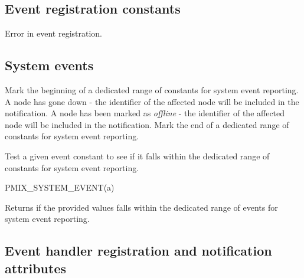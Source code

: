 \subsection{Event registration constants}
\label{api:struct:constants:event}

\begin{constantdesc}
%
Error in event registration.
%
\end{constantdesc}

\subsection{System events}
\label{api:struct:sys:event}

\begin{constantdesc}
%
Mark the beginning of a dedicated range of constants for system event reporting.
%
A node has gone down - the identifier of the affected node will be included in the notification.
%
A node has been marked as \emph{offline} - the identifier of the affected node will be included in the notification.
%
Mark the end of a dedicated range of constants for system event reporting.
%
\end{constantdesc}


Test a given event constant to see if it falls within the dedicated range of constants for system event reporting.

\cspecificstart
\begin{codepar}
PMIX_SYSTEM_EVENT(a)
\end{codepar}
\cspecificend

\begin{arglist}
\end{arglist}

Returns  if the provided values falls within the dedicated range of events for system event reporting.

\subsection{Event handler registration and notification attributes}
\label{api:struct:attributes:event}

